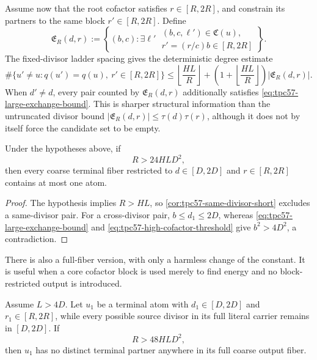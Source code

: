 Assume now that the root cofactor satisfies \(r\in[R,2R]\), and constrain
its partners to the same block \(r'\in[R,2R]\).  Define
\begin{equation}
 \mathfrak E_R(d,r)
 :=\left\{(b,c):\exists\ell'\;
   \begin{array}{l}
   (b,c,\ell')\in\mathfrak C(u),\\[-2pt]
   r'=(r/c)b\in[R,2R]
   \end{array}\right\}.
 \label{eq:tpc57-same-block-exchange-set}
\end{equation}
The fixed-divisor ladder spacing gives the
deterministic degree estimate
\begin{equation}
 \#\{u'\ne u:q(u')=q(u),\ r'\in[R,2R]\}
 \le
 \left\lfloor\frac{HL}{R}\right\rfloor
 +\left(1+\left\lfloor\frac{HL}{R}\right\rfloor\right)
   |\mathfrak E_R(d,r)|.
 \label{eq:tpc57-partner-degree-bound}
\end{equation}
When \(d'\ne d\), every pair counted by
\(\mathfrak E_R(d,r)\) additionally satisfies
\eqref{eq:tpc57-large-exchange-bound}.  This is sharper structural
information than the untruncated divisor bound
\(|\mathfrak E_R(d,r)|\le\tau(d)\tau(r)\), although it does not by itself
force the candidate set to be empty.

\begin{corollary}
\label{cor:tpc57-high-cofactor-exclusion}
Under the hypotheses above, if
\begin{equation}
 R>24HLD^2,
 \label{eq:tpc57-high-cofactor-threshold}
\end{equation}
then every coarse terminal fiber restricted to
\(d\in[D,2D]\) and \(r\in[R,2R]\) contains at most one atom.
\end{corollary}

\begin{proof}
The hypothesis implies \(R>HL\), so
\cref{cor:tpc57-same-divisor-short} excludes a same-divisor pair.  For a
cross-divisor pair, \(b\le d_1\le2D\), whereas
\eqref{eq:tpc57-large-exchange-bound} and
\eqref{eq:tpc57-high-cofactor-threshold} give \(b^2>4D^2\), a
contradiction.
\end{proof}

There is also a full-fiber version, with only a harmless change of the
constant.  It is useful when a core cofactor block is used merely to find
energy and no block-restricted output is introduced.

\begin{corollary}
\label{cor:tpc57-high-cofactor-full-singleton}
Assume \(L>4D\).  Let \(u_1\) be a terminal atom with \(d_1\in[D,2D]\) and
\(r_1\in[R,2R]\), while every possible source divisor in its full literal
carrier remains in \([D,2D]\).  If
\begin{equation}
 R>48HLD^2,
 \label{eq:tpc57-full-singleton-threshold}
\end{equation}
then \(u_1\) has no distinct terminal partner anywhere in its full coarse
output fiber.
\end{corollary}

